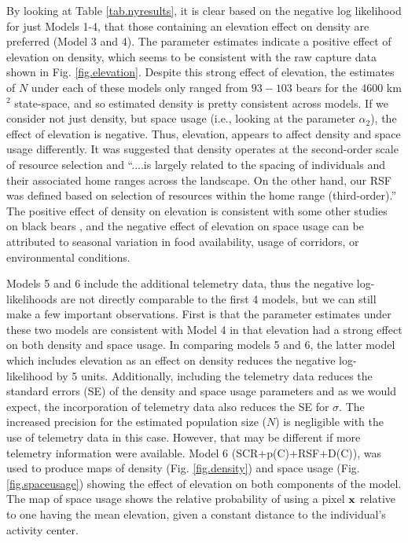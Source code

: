 By looking at Table \ref{tab.nyresults}, it is clear based on the
negative log likelihood for just Models 1-4, that those containing an
elevation effect on density are preferred (Model 3 and 4).  The
parameter estimates indicate a positive effect of elevation on
density, which seems to be consistent with the raw capture data shown
in Fig. \ref{fig.elevation}.  Despite this strong effect
of elevation, the estimates of $N$ under each of these models only
ranged from $93 - 103$ bears for the 4600 km$^2$ state-space, and so
estimated density is pretty consistent across models.
  If we
consider not just density, but space usage (i.e., looking at the
parameter $\alpha_2$), the effect of elevation is negative.  Thus, elevation, appears to affect density and space usage
differently.  It was suggested that density operates at the
second-order scale of resource selection and ``....is largely related
to the spacing of individuals and their associated home ranges across
the landscape.  On the other hand, our RSF was defined based on
selection of resources within the home range (third-order).''
\citep{royle_etal:2012mee}
The positive effect of density on elevation
is consistent with some other studies on black bears \citep[e.g.][]{frary_etal:2011},
and the negative effect of elevation on space usage can be attributed to
seasonal variation in food availability, usage of corridors, or
environmental conditions.


Models 5 and 6 include the additional telemetry data, thus the
negative log-likelihoods are not directly comparable to the first 4
models, but we can still make a few important observations.  First is
that the parameter estimates under these two models are consistent
with Model 4 in that elevation had a strong effect on both density and
space usage.  In comparing models 5 and 6, the latter model which
includes elevation as an effect on density reduces the negative
log-likelihood by 5 units.  Additionally, including the telemetry data
reduces the standard errors (SE) of the density and space usage
parameters and as we would expect, the incorporation of telemetry data
also reduces the SE for $\sigma$.  The increased precision for the
estimated population size ($N$) is negligible with the use of
telemetry data in this case.  However, that may be different if more
telemetry information were available.  Model 6 (SCR+p(C)+RSF+D(C)),
was used to produce maps of density (Fig. \ref{fig.density}) and space
usage (Fig. \ref{fig.spaceusage}) showing the effect of elevation on
both components of the model.  The map of space usage shows the
relative probability of using a pixel ${\bf x}$ relative to one having
the mean elevation, given a constant distance to the individual's
activity center.


